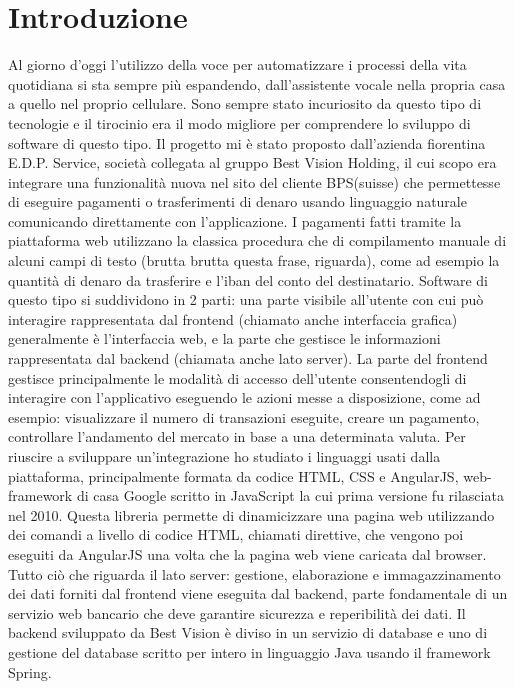 \chapter{Introduzione}
Al giorno d'oggi l'utilizzo della voce per automatizzare i processi della vita quotidiana si sta sempre più espandendo, dall'assistente vocale nella propria casa a quello nel proprio cellulare. Sono sempre stato incuriosito da questo tipo di tecnologie e il tirocinio era il modo migliore per comprendere lo sviluppo di software di questo tipo. Il progetto mi è stato proposto dall'azienda fiorentina E.D.P. Service, società collegata al gruppo Best Vision Holding, il cui scopo era integrare una funzionalità nuova nel sito del cliente BPS(suisse) che permettesse di eseguire pagamenti o trasferimenti di denaro usando linguaggio naturale comunicando direttamente con l'applicazione.
I pagamenti fatti tramite la piattaforma web utilizzano la classica procedura che di compilamento manuale di alcuni campi di testo (brutta brutta questa frase, riguarda), come ad esempio la quantità di denaro da trasferire e l'iban del conto del destinatario.
Software di questo tipo si suddividono in 2 parti: una parte visibile all'utente con cui può interagire rappresentata dal frontend (chiamato anche interfaccia grafica) generalmente è l'interfaccia web, e la parte che gestisce le informazioni rappresentata dal backend (chiamata anche lato server).
La parte del frontend gestisce principalmente le modalità di accesso dell'utente consentendogli di interagire con l'applicativo eseguendo le azioni messe a disposizione, come ad esempio: visualizzare il numero di transazioni eseguite, creare un pagamento, controllare l'andamento del mercato in base a una determinata valuta.
Per riuscire a sviluppare un'integrazione ho studiato i linguaggi usati dalla piattaforma, principalmente formata da codice HTML, CSS e AngularJS, web-framework di casa Google scritto in JavaScript la cui prima versione fu rilasciata nel 2010. Questa libreria permette di dinamicizzare una pagina web utilizzando dei comandi a livello di codice HTML, chiamati direttive, che vengono poi eseguiti da AngularJS una volta che la pagina web viene caricata dal browser.
Tutto ciò che riguarda il lato server: gestione, elaborazione e immagazzinamento dei dati forniti dal frontend viene eseguita dal backend, parte fondamentale di un servizio web bancario che deve garantire sicurezza e reperibilità dei dati. Il backend sviluppato da Best Vision è diviso in un servizio di database e uno di gestione del database scritto per intero in linguaggio Java usando il framework Spring.
